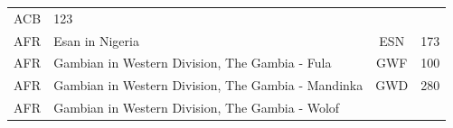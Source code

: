 \documentclass[]{book}
\theoremstyle{definition}
\theoremstyle{definition}
\theoremstyle{definition}
\theoremstyle{remark}
\begin{document}
\begin{longtable}[]{@{}clcc@{}}
\begin{minipage}[t]{0.09\columnwidth}
ACB\strut
\end{minipage} & \begin{minipage}[t]{0.07\columnwidth}\centering\strut
123\strut
\end{minipage}\tabularnewline
\begin{minipage}[t]{0.14\columnwidth}\centering\strut
AFR\strut
\end{minipage} & \begin{minipage}[t]{0.59\columnwidth}\raggedright\strut
Esan in Nigeria\strut
\end{minipage} & \begin{minipage}[t]{0.09\columnwidth}\centering\strut
ESN\strut
\end{minipage} & \begin{minipage}[t]{0.07\columnwidth}\centering\strut
173\strut
\end{minipage}\tabularnewline
\begin{minipage}[t]{0.14\columnwidth}\centering\strut
AFR\strut
\end{minipage} & \begin{minipage}[t]{0.59\columnwidth}\raggedright\strut
Gambian in Western Division, The Gambia - Fula\strut
\end{minipage} & \begin{minipage}[t]{0.09\columnwidth}\centering\strut
GWF\strut
\end{minipage} & \begin{minipage}[t]{0.07\columnwidth}\centering\strut
100\strut
\end{minipage}\tabularnewline
\begin{minipage}[t]{0.14\columnwidth}\centering\strut
AFR\strut
\end{minipage} & \begin{minipage}[t]{0.59\columnwidth}\raggedright\strut
Gambian in Western Division, The Gambia - Mandinka\strut
\end{minipage} & \begin{minipage}[t]{0.09\columnwidth}\centering\strut
GWD\strut
\end{minipage} & \begin{minipage}[t]{0.07\columnwidth}\centering\strut
280\strut
\end{minipage}\tabularnewline
\begin{minipage}[t]{0.14\columnwidth}\centering\strut
AFR\strut
\end{minipage} & \begin{minipage}[t]{0.59\columnwidth}\raggedright\strut
Gambian in Western Division, The Gambia - Wolof\strut

\end{minipage}
\end{longtable}
\end{document}
